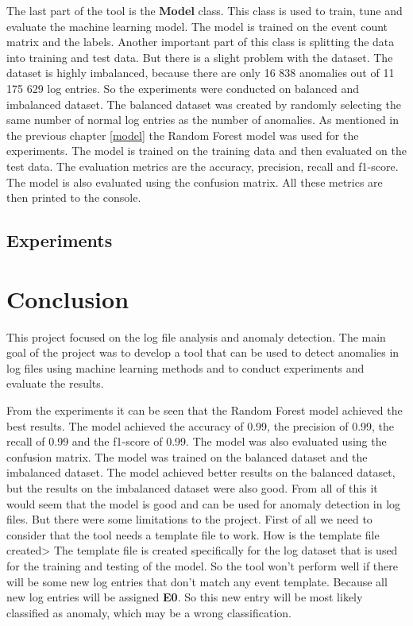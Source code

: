 The last part of the tool is the \textbf{Model} class. This class is used to train, tune and evaluate the machine learning model. The model is trained on the event count matrix and the labels.
Another important part of this class is splitting the data into training and test data.
But there is a slight problem with the dataset. The dataset is highly imbalanced, because there are only 16 838 anomalies out of 11 175 629 log entries.
So the experiments were conducted on balanced and imbalanced dataset. The balanced dataset was created by randomly selecting the same number of normal log entries as the number of anomalies.
As mentioned in the previous chapter \ref{model} the Random Forest model was used for the experiments. The model is trained on the training data and then evaluated on the test data.
The evaluation metrics are the accuracy, precision, recall and f1-score. The model is also evaluated using the confusion matrix. All these metrics are then printed to the console.

\section{Experiments}


\chapter{Conclusion}

This project focused on the log file analysis and anomaly detection.
The main goal of the project was to develop a tool that can be used to detect anomalies in log files using machine learning methods and to conduct experiments and evaluate the results.

From the experiments it can be seen that the Random Forest model achieved the best results. The model achieved the accuracy of 0.99, the precision of 0.99, the recall of 0.99 and the f1-score of 0.99.
The model was also evaluated using the confusion matrix. The model was trained on the balanced dataset and the imbalanced dataset. The model achieved better results on the balanced dataset, but the results on the imbalanced dataset were also good.
From all of this it would seem that the model is good and can be used for anomaly detection in log files. But there were some limitations to the project. 
First of all we need to consider that the tool needs a template file to work. How is the template file created> The template file is created specifically for the log dataset that is used for the training and testing of the model.
So the tool won't perform well if there will be some new log entries that don't match any event template. Because all new log entries will be assigned \textbf{E0}. So this new entry will be most likely classified as anomaly, which 
may be a wrong classification.

